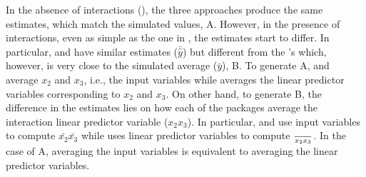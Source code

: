 %
In the absence of interactions (), the three approaches produce the same estimates, which match the simulated values, A. However, in the presence of interactions, even as simple as the one in , the estimates start to differ. In particular,  and  have similar estimates ($\bar{\hat{y}}$) but different from the 's which, however, is very close to the simulated average ($\bar{y}$), B. To generate A,   and  average $x_2$ and $x_3$, i.e., the input variables while  averages the linear predictor variables corresponding to $x_2$ and $x_3$. On other hand, to generate B, the difference in the estimates lies on how each of the packages average the interaction linear predictor variable ($x_2x_3$). In particular,  and  use input variables to compute $\bar{x_2}\bar{x_3}$ while  uses linear predictor variables to compute $\over{x_2x_3}$. In the case of A, averaging the input variables is equivalent to averaging the linear predictor variables.

